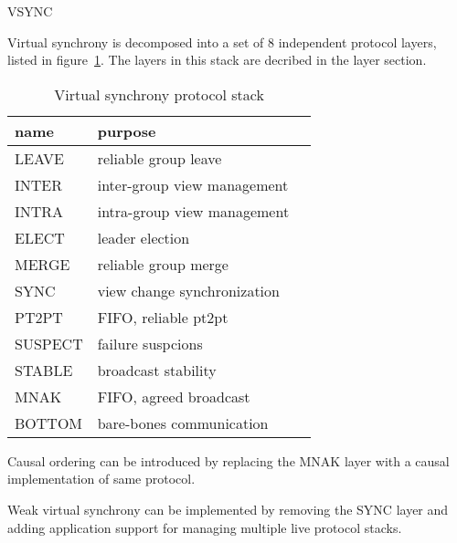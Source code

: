 \begin{Stack}{VSYNC}

Virtual synchrony is decomposed into a set of 8 independent protocol
layers, listed in figure~\ref{vsynclayers}.  The layers in this stack are
decribed in the layer section.

\begin{table}[b]
\begin{center}
\begin{tabular}{|l|l|l|}			   \hline
name		& purpose			\\ \hline
LEAVE		& reliable group leave		\\ \hline
INTER		& inter-group view management	\\ \hline
INTRA		& intra-group view management	\\ \hline
ELECT		& leader election		\\ \hline
MERGE		& reliable group merge		\\ \hline
SYNC		& view change synchronization	\\ \hline
PT2PT		& FIFO, reliable pt2pt		\\ \hline
SUSPECT		& failure suspcions		\\ \hline
STABLE		& broadcast stability		\\ \hline
MNAK		& FIFO, agreed broadcast	\\ \hline
BOTTOM		& bare-bones communication	\\ \hline
\end{tabular}
\end{center}
\caption{Virtual synchrony protocol stack}
\label{vsynclayers}
\end{table}


\begin{Parameters}
\item {}
\end{Parameters}

\begin{Protocol}
\end{Protocol}

\begin{Properties}
\item
{}
\end{Properties}

\begin{Notes}
\item
Causal ordering can be introduced by replacing the MNAK layer with a
causal implementation of same protocol.
\item
Weak virtual synchrony can be implemented by removing the SYNC layer
and adding application support for managing multiple live protocol
stacks.
\end{Notes}


\end{Stack}
